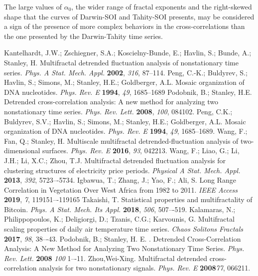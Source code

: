 \documentclass[onecolumn, preprint,aps,amsmath, amssymb, superscriptaddress]{revtex4}
\begin{document}
The large values of $\alpha_0$, the wider range of fractal exponents and the right-skewed shape that the curves of Darwin-SOI and Tahity-SOI presents,  may be considered a sign of the presence of more complex behaviors in the cross-correlations than the one presented by the Darwin-Tahity time series.

\begin{thebibliography}{99}
Kantelhardt, J.W.; Zschiegner, S.A.; Koscielny-Bunde, E.; Havlin, S.; Bunde, A.; Stanley, H. Multifractal detrended fluctuation analysis of nonstationary time series. {\em Phys. A Stat. Mech. Appl.} {\bf 2002}, {\em 316}, 87--114.
Peng, C.-K.; Buldyrev, S.; Havlin, S.; Simons, M.; Stanley, H.E.; Goldberger, A.L. Mosaic organization of DNA nucleotides. {\em Phys. Rev. E} {\bf 1994}, {\em 49}, 1685--1689
Podobnik, B.; Stanley, H.E. Detrended cross-correlation analysis: A new method for analyzing two nonstationary time series. {\em Phys. Rev. Lett.} {\bf 2008}, {\em 100}, 084102.
Peng, C.K.; Buldyrev, S.V.; Havlin, S.; Simons, M.; Stanley, H.E.; Goldberger, A.L. Mosaic organization of DNA nucleotides. {\em Phys. Rev. E} {\bf 1994}, {\em 49}, 1685--1689.
Wang, F.; Fan, Q.; Stanley, H. Multiscale multifractal detrended-fluctuation analysis of two-dimensional surfaces. {\em Phys. Rev. E} {\bf 2016}, {\em 93}, 042213.
Wang, F.; Liao, G.; Li, J.H.; Li, X.C.; Zhou, T.J. Multifractal detrended fluctuation analysis for clustering structures of electricity price periods. {\em Physical A Stat. Mech. Appl.} {\bf 2013}, {\em 392}, 5723–-5734.
Igbawua, T.; Zhang, J.; Yao, F.; Ali, S. Long Range Correlation in Vegetation Over West Africa from 1982 to 2011. {\em IEEE Access} {\bf 2019}, {\em 7}, 119151–-119165
Takaishi, T. Statistical properties and multifractality of Bitcoin. {\em Phys. A Stat. Mech. Its Appl.} {\bf 2018}, {\em 506}, 507–-519.
Kalamaras, N.; Philippopoulos, K.; Deligiorgi, D.; Tzanis, C.G.; Karvounis, G. Multifractal scaling properties of daily air temperature time series. {\em Chaos Solitons Fractals} {\bf 2017}, {\em 98}, 38–-43.
Podobnik, B.; Stanley, H. E. . Detrended Cross-Correlation Analysis: A New Method for Analyzing Two Nonstationary Time Series. {\em Phys. Rev. Lett.} {\bf 2008} {\em 100} 1–-11.
 Zhou,Wei-Xing. Multifractal detrended cross-correlation analysis for two nonstationary signals. {\em Phys. Rev. E} {\bf 2008}{\em 77}, 066211.

\end{thebibliography}
\end{document}
